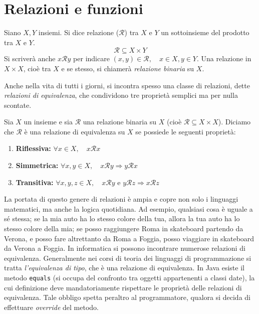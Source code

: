\documentclass[oneside]{book}
\begin{document}
\section{Relazioni e funzioni}
\begin{tcolorbox}[colback=yellow!30, colframe=yellow!30!black, title={Relazione}]
Siano $X,Y$ insiemi. Si dice relazione ($\mathcal{R}$) tra $X$ e $Y$ un sottoinsieme
del prodotto tra $X$ e $Y$.
\[\mathcal{R}\subseteq X\times Y\]
Si scriverà anche $x\mathcal{R}y$ per indicare $(x,y)\in\mathcal{R},
\quad x\in X,y\in Y$. Una relazione in $X\times X$, cioè tra $X$ e se stesso,
si chiamerà \textit{relazione binaria} su $X$.
\end{tcolorbox}

Anche nella vita di tutti i giorni, si incontra spesso una classe di relazioni,
dette \textit{relazioni di equivalenza}, che condividono tre proprietà semplici ma per
nulla scontate.

\begin{tcolorbox}[colback=yellow!30, colframe=yellow!30!black, title={Relazione di equivalenza}]
Sia $X$ un insieme e sia $\mathcal{R}$ una relazione binaria su $X$
(cioè $\mathcal{R} \subseteq X \times X$). Diciamo che $\mathcal{R}$ è una
relazione di equivalenza su $X$ se possiede le seguenti proprietà:
\begin{enumerate}
    \item \textbf{Riflessiva:} $\forall x \in X, \quad x \mathcal{R} x$
    \item \textbf{Simmetrica:} $\forall x,y \in X, \quad x \mathcal{R}y \Longrightarrow y \mathcal{R} x$
    \item \textbf{Transitiva:} $\forall x,y,z \in X, \quad x \mathcal{R} y \text{ e } y \mathcal{R} z \Longrightarrow x \mathcal{R} z$
\end{enumerate}
\end{tcolorbox}
La portata di questo genere di relazioni è ampia e copre non solo i linguaggi
matematici, ma anche la logica quotidiana. Ad esempio, qualsiasi cosa è uguale
a sé stessa; se la mia auto ha lo stesso colore della tua, allora la tua auto ha lo stesso
colore della mia; se posso raggiungere Roma in skateboard partendo da Verona,
e posso fare altrettanto da Roma a Foggia, posso viaggiare in skateboard da
Verona a Foggia. In informatica si possono incontrare numerose relazioni di
equivalenza. Generalmente nei corsi di teoria dei linguaggi di programmazione
si tratta \textit{l'equivalenza di tipo}, che è una relazione di equivalenza.
In Java esiste il metodo \texttt{equals} (si occupa del confronto tra oggetti
appartenenti a classi date), la cui definizione deve mandatoriamente
rispettare le proprietà delle relazioni di equivalenza. Tale obbligo spetta
peraltro al programmatore, qualora si decida di effettuare \textit{override}
del metodo.
\end{document}
